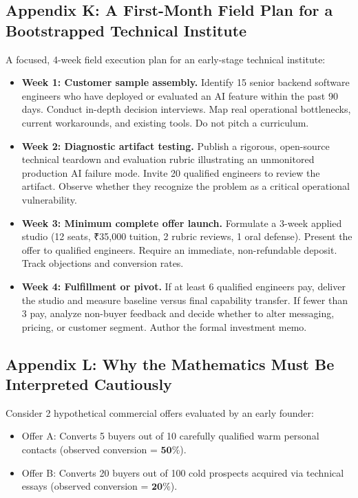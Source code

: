 \subsection*{Appendix K: A First-Month Field Plan for a Bootstrapped Technical Institute}

A focused, 4-week field execution plan for an early-stage technical institute:

\begin{itemize}
    \item \textbf{Week 1: Customer sample assembly.} Identify 15 senior backend software engineers who have deployed or evaluated an AI feature within the past 90 days. Conduct in-depth decision interviews. Map real operational bottlenecks, current workarounds, and existing tools. Do not pitch a curriculum.
    \item \textbf{Week 2: Diagnostic artifact testing.} Publish a rigorous, open-source technical teardown and evaluation rubric illustrating an unmonitored production AI failure mode. Invite 20 qualified engineers to review the artifact. Observe whether they recognize the problem as a critical operational vulnerability.
    \item \textbf{Week 3: Minimum complete offer launch.} Formulate a 3-week applied studio (12 seats, ₹35,000 tuition, 2 rubric reviews, 1 oral defense). Present the offer to qualified engineers. Require an immediate, non-refundable deposit. Track objections and conversion rates.
    \item \textbf{Week 4: Fulfillment or pivot.} If at least 6 qualified engineers pay, deliver the studio and measure baseline versus final capability transfer. If fewer than 3 pay, analyze non-buyer feedback and decide whether to alter messaging, pricing, or customer segment. Author the formal investment memo.
\end{itemize}

\subsection*{Appendix L: Why the Mathematics Must Be Interpreted Cautiously}

Consider 2 hypothetical commercial offers evaluated by an early founder:
\begin{itemize}
    \item Offer A: Converts 5 buyers out of 10 carefully qualified warm personal contacts (observed conversion = $\mathbf{50\%}$).
    \item Offer B: Converts 20 buyers out of 100 cold prospects acquired via technical essays (observed conversion = $\mathbf{20\%}$).
\end{itemize}

